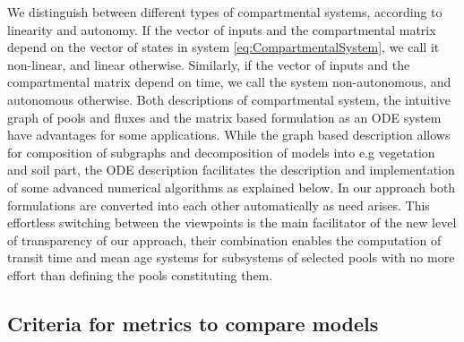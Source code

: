 We distinguish between different types of compartmental systems, according to linearity and autonomy. If the vector of inputs and the compartmental matrix depend on the vector of states in system \eqref{eq:CompartmentalSystem}, we call it non-linear, and linear otherwise. Similarly, if the vector of inputs and the compartmental matrix depend on time, we call the system non-autonomous, and autonomous otherwise. 
Both descriptions of compartmental system, the intuitive graph of pools and fluxes and the 
matrix based formulation as an ODE system have advantages for some applications. 
While the graph based description allows for composition of subgraphs and decomposition of models into e.g vegetation and soil part, the ODE description facilitates the description and implementation of some advanced numerical algorithms as explained below.
In our approach both formulations are converted into each other automatically as need arises.
This effortless switching between the viewpoints is the main facilitator of the new level of transparency of our approach, their combination enables the computation of transit time and mean age systems for subsystems of selected pools with no more effort than defining the pools constituting them.

\subsection{Criteria for metrics to compare models \label{sec:criteria}}

